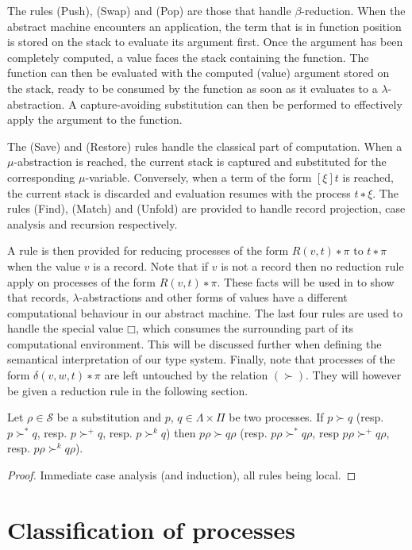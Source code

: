 The rules (Push), (Swap) and (Pop) are those that handle $β$-reduction. When
the abstract machine encounters an application, the term that is in function
position is stored on the stack to evaluate its argument first. Once the
argument has been completely computed, a value faces the stack containing the
function. The function can then be evaluated with the computed (value)
argument stored on the stack, ready to be consumed by the function as soon as
it evaluates to a $λ$-abstraction. A capture-avoiding substitution can then be
performed to effectively apply the argument to the function.

The (Save) and (Restore) rules handle the classical part of computation. When
a $μ$-abstraction is reached, the current stack is captured and substituted
for the corresponding $μ$-variable. Conversely, when a term of the form $[ξ]t$
is reached, the current stack is discarded and evaluation resumes with the
process $t ∗ ξ$. The rules (Find), (Match) and (Unfold) are provided to handle
record projection, case analysis and recursion respectively.

A rule is then provided for reducing processes of the form $R(v,t) ∗ π$ to
$t ∗ π$ when the value $v$ is a record. Note that if $v$ is not a record then
no reduction rule apply on processes of the form $R(v,t) ∗ π$. These facts
will be used in to show that records, $λ$-abstractions and other forms of
values have a different computational behaviour in our abstract machine.
The last four rules are used to handle the special value $□$, which consumes
the surrounding part of its computational environment. This will be discussed
further when defining the semantical interpretation of our type system.
%
Finally, note that processes of the form $δ(v,w,t) ∗ π$ are left untouched
by the relation $(≻)$. They will however be given a reduction rule in the
following section.

\begin{theorem}\label{thm:redcompatall}%
  Let $ρ ∈ \mathcal{S}$ be a substitution and $p$, $q ∈ Λ×Π$ be two processes.
  If $p ≻ q$ (resp. $p ≻^{*} q$, resp. $p ≻^{+} q$, resp. $p ≻^k q$) then
  $pρ ≻ qρ$ (resp. $pρ ≻^{*} qρ$, resp $pρ ≻^{+} qρ$, resp. $pρ ≻^k qρ$).
\end{theorem}
\begin{proof}
  Immediate case analysis (and induction), all rules being local.
\end{proof}

\section{Classification of processes}

